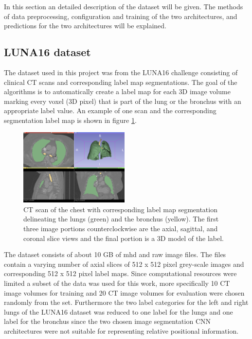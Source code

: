 
In this section an detailed description of the dataset will be given. The methods of data preprocessing, configuration and training of the two architectures, and predictions for the two architectures will be explained.

\subsection{LUNA16 dataset}

The dataset used in this project was from the LUNA16 challenge consisting of clinical CT scans and corresponding label map segmentations. The goal of the algorithms is to automatically create a label map for each 3D image volume marking every voxel (3D pixel) that is part of the lung or the bronchus with an appropriate label value. An example of one scan and the corresponding segmentation label map is shown in figure \ref{scan_picture}.

\begin{figure}[h!]
	\includegraphics[width=0.49\textwidth, angle=0]{files/Fulllayoutprediction.png}
	\caption{CT scan of the chest with corresponding label map segmentation delineating the lungs (green) and the bronchus (yellow). The first three image portions counterclockwise are the axial, sagittal, and coronal slice views and the final portion is a 3D model of the label.}
	\label{scan_picture}
\end{figure}

The dataset consists of about 10 GB of mhd and raw image files. The files contain a varying number of axial slices of 512 x 512 pixel grey-scale images and corresponding 512 x 512 pixel label maps. Since computational resources were limited a subset of the data was used for this work, more specifically 10 CT image volumes for training and 20 CT image volumes for evaluation were chosen randomly from the set. Furthermore the two label categories for the left and right lungs of the LUNA16 dataset was reduced to one label for the lungs and one label for the bronchus since the two chosen image segmentation CNN architectures were not suitable for representing relative positional information.\newline

